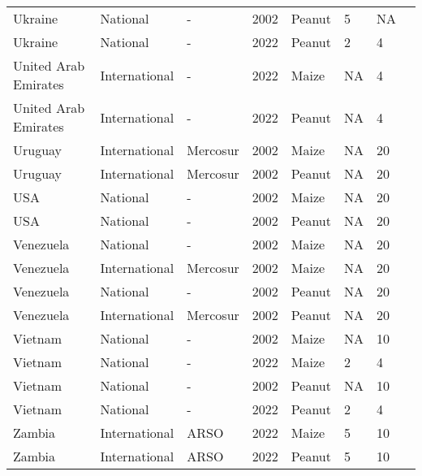 \begin{landscape}
\begin{longtable}[c]{llllllll}
Ukraine           & National      & -        & 2002 & Peanut & 5  & NA & \citet{van2004worldwide}     \\
Ukraine           & National      & -        & 2022 & Peanut & 2  & 4  & \citet{MOZ2013}              \\
United Arab Emirates &
  International &
  - &
  2022 &
  Maize &
  NA &
  4 &
  \citet{van2004worldwide} \\
United Arab Emirates &
  International &
  - &
  2022 &
  Peanut &
  NA &
  4 &
  \citet{van2004worldwide} \\
Uruguay           & International & Mercosur & 2002 & Maize  & NA & 20 & \citet{MERCOSUR2002}         \\
Uruguay           & International & Mercosur & 2002 & Peanut & NA & 20 & \citet{MERCOSUR2002}         \\
USA               & National      & -        & 2002 & Maize  & NA & 20 & \citet{van2004worldwide}     \\
USA               & National      & -        & 2002 & Peanut & NA & 20 & \citet{van2004worldwide}     \\
Venezuela         & National      & -        & 2002 & Maize  & NA & 20 & \citet{van2004worldwide}     \\
Venezuela         & International & Mercosur & 2002 & Maize  & NA & 20 & \citet{MERCOSUR2002}         \\
Venezuela         & National      & -        & 2002 & Peanut & NA & 20 & \citet{van2004worldwide}     \\
Venezuela         & International & Mercosur & 2002 & Peanut & NA & 20 & \citet{MERCOSUR2002}         \\
Vietnam           & National      & -        & 2002 & Maize  & NA & 10 & \citet{van2004worldwide}     \\
Vietnam           & National      & -        & 2022 & Maize  & 2  & 4  & \citet{MOH2011}              \\
Vietnam           & National      & -        & 2002 & Peanut & NA & 10 & \citet{van2004worldwide}     \\
Vietnam           & National      & -        & 2022 & Peanut & 2  & 4  & \citet{MOH2011}              \\
Zambia            & International & ARSO     & 2022 & Maize  & 5  & 10 & \citet{ARSO2022}             \\
Zambia            & International & ARSO     & 2022 & Peanut & 5  & 10 & \citet{ARSO2022}             \\

\end{longtable}
\end{landscape}
